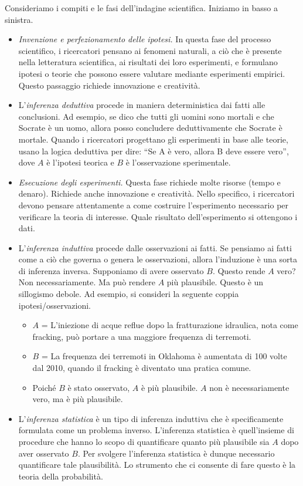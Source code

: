 \documentclass[
  10pt,
  italian,
  a4paper,
  extrafontsizes,onecolumn,openright
  ]{memoir}
\newlength{\rf}
\theoremstyle{definition}
\theoremstyle{definition}
\theoremstyle{definition}
\theoremstyle{definition}
\theoremstyle{remark}
\begin{document}
Consideriamo i compiti e le fasi dell'indagine scientifica. Iniziamo in basso a sinistra.

\begin{itemize}
\item
  \emph{Invenzione e perfezionamento delle ipotesi.} In questa fase del processo scientifico, i ricercatori pensano ai fenomeni naturali, a ciò che è presente nella letteratura scientifica, ai risultati dei loro esperimenti, e formulano ipotesi o teorie che possono essere valutare mediante esperimenti empirici. Questo passaggio richiede innovazione e creatività.
\item
  L'\emph{inferenza deduttiva} procede in maniera deterministica dai fatti alle conclusioni. Ad esempio, se dico che tutti gli uomini sono mortali e che Socrate è un uomo, allora posso concludere deduttivamente che Socrate è mortale. Quando i ricercatori progettano gli esperimenti in base alle teorie, usano la logica deduttiva per dire: ``Se A è vero, allora B deve essere vero'', dove \(A\) è l'ipotesi teorica e \(B\) è l'osservazione sperimentale.
\item
  \emph{Esecuzione degli esperimenti.} Questa fase richiede molte risorse (tempo e denaro). Richiede anche innovazione e creatività. Nello specifico, i ricercatori devono pensare attentamente a come costruire l'esperimento necessario per verificare la teoria di interesse. Quale risultato dell'esperimento si ottengono i dati.
\item
  L'\emph{inferenza induttiva} procede dalle osservazioni ai fatti. Se pensiamo ai fatti come a ciò che governa o genera le osservazioni, allora l'induzione è una sorta di inferenza inversa. Supponiamo di avere osservato \(B\). Questo rende \(A\) vero? Non necessariamente. Ma può rendere \(A\) più plausibile. Questo è un sillogismo debole. Ad esempio, si consideri la seguente coppia ipotesi/osservazioni.

  \begin{itemize}
  \item
    \(A\) = L'iniezione di acque reflue dopo la fratturazione idraulica, nota come fracking, può portare a una maggiore frequenza di terremoti.
  \item
    \(B\) = La frequenza dei terremoti in Oklahoma è aumentata di 100 volte dal 2010, quando il fracking è diventato una pratica comune.
  \item
    Poiché \(B\) è stato osservato, \(A\) è più plausibile. \(A\) non è necessariamente vero, ma è più plausibile.
  \end{itemize}
\item
  L'\emph{inferenza statistica} è un tipo di inferenza induttiva che è specificamente formulata come un problema inverso. L'inferenza statistica è quell'insieme di procedure che hanno lo scopo di quantificare quanto più plausibile sia \(A\) dopo aver osservato \(B\). Per svolgere l'inferenza statistica è dunque necessario quantificare tale plausibilità. Lo strumento che ci consente di fare questo è la teoria della probabilità.
\end{itemize}
\end{document}
